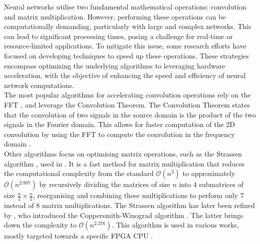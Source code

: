 Neural networks utilise two fundamental mathematical operations: convolution and
matrix multiplication. However, performing these operations can be
computationally demanding, particularly with large and complex networks. This
can lead to significant processing times, posing a challenge for real-time or
resource-limited applications. To mitigate this issue, some research efforts
have focused on developing techniques to speed up these operations. These
strategies encompass optimizing the underlying algorithms to leveraging hardware
acceleration, with the objective of enhancing the speed and efficiency of neural
network computations.\\


The most popular algorithms for accelerating convolution operations rely on the
\ac{FFT}
\cite{DBLP:conf/nips/ChiJM20,DBLP:journals/npl/LinY19,DBLP:conf/pkdd/PrattWCZ17},
and leverage the Convolution Theorem. The Convolution Theorem states that the
convolution of two signals in the source domain is the product of the two
signals in the Fourier domain. This allows for faster computation of the 2D
convolution by using the \ac{FFT} to compute the convolution in the frequency
domain \cite{oppenheim1997signals}.\\


Other algorithms focus on optimising matrix operations, such as the Strassen
algorithm \cite{strassen1969gaussian}, used in \cite{DBLP:conf/icann/CongX14}.
It is a fast method for matrix multiplication that reduces the computational
complexity from the standard $\mathcal{O}(n^{3})$ to approximately
$\mathcal{O}(n^{2.807})$ by recursively dividing the matrices of size $n$ into 4
submatrices of size $\frac{n}{2} \times \frac{n}{2}$, reorganising and combining
these multiplications to perform only 7 instead of 8 matrix multiplications. The
Strassen algorithm has later been refined by \citeauthor{coppersmith1987matrix},
who introduced the Coppersmith-Winograd algorithm \cite{coppersmith1987matrix}.
The latter brings down the complexity to $\mathcal{O}(n^{2.376})$. This
algorithm is used in various works, mostly targeted towards a specific \ac{FPGA}
\ac{CPU} \cite{liu2018efficient,lu2018spwa,wang2020winonn}.\\


